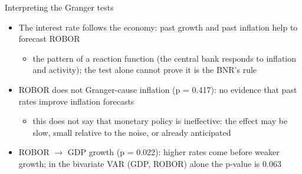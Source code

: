 \begin{frame}{Interpreting the Granger tests}
\itemsize{\small}
\begin{itemize}
    \item The interest rate follows the economy: past growth and past inflation help to forecast ROBOR
    \begin{itemize}
        \item the pattern of a reaction function (the central bank responds to inflation and activity); the test alone cannot prove it is the BNR's rule
    \end{itemize}
    \item ROBOR does not Granger-cause inflation (p = 0.417): no evidence that past rates improve inflation forecasts
    \begin{itemize}
        \item this does not say that monetary policy is ineffective: the effect may be slow, small relative to the noise, or already anticipated
    \end{itemize}
    \item ROBOR $\to$ GDP growth (p = 0.022): higher rates come before weaker growth; in the bivariate VAR (GDP, ROBOR) alone the p-value is 0.063
\end{itemize}
\end{frame}

